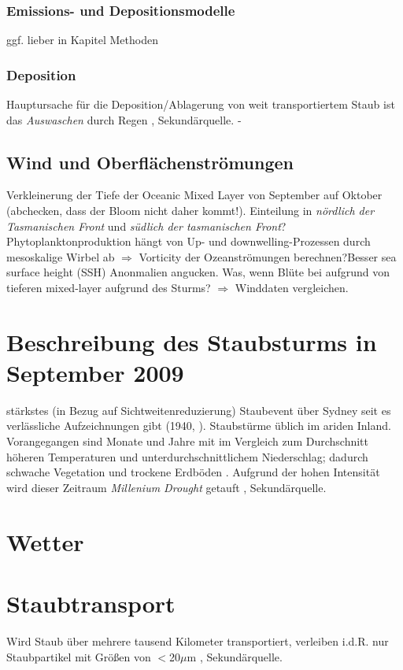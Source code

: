 \documentclass[12pt,a4paper,onecolumn]{scrartcl}
\begin{document}
\subsubsection{Emissions- und Depositionsmodelle}
ggf. lieber in Kapitel Methoden
\subsubsection{Deposition}
Hauptursache für die Deposition/Ablagerung von weit transportiertem Staub ist das \textit{Auswaschen} durch Regen \citep{Marx.2018}, Sekundärquelle. - 

\subsection{Wind und Oberflächenströmungen}
Verkleinerung der Tiefe der Oceanic Mixed Layer von September auf Oktober \citep{Tilburg.2002} (abchecken, dass der Bloom nicht daher kommt!). Einteilung in \textit{nördlich der Tasmanischen Front} und \textit{südlich der tasmanischen Front}? Phytoplanktonproduktion hängt von Up- und downwelling-Prozessen durch mesoskalige Wirbel ab \citep{Tilburg.2002} $\Rightarrow$ Vorticity der Ozeanströmungen berechnen?Besser sea surface height (SSH) Anonmalien angucken. Was, wenn Blüte bei \citet{Gabric.2016} aufgrund von tieferen mixed-layer aufgrund des Sturms? $\Rightarrow$ Winddaten vergleichen. 
\section{Beschreibung des Staubsturms in September 2009}
stärkstes (in Bezug auf Sichtweitenreduzierung) Staubevent über Sydney seit es verlässliche Aufzeichnungen gibt (1940, \citet{Leys.2011}). Staubstürme üblich im ariden Inland. Vorangegangen sind Monate und Jahre mit im Vergleich zum Durchschnitt höheren Temperaturen und unterdurchschnittlichem Niederschlag; dadurch schwache Vegetation und trockene Erdböden \citep{Leys.2011}. Aufgrund der hohen Intensität wird dieser Zeitraum \textit{Millenium Drought} getauft \citep{Deckker.2014}, Sekundärquelle.
\section{Wetter}

\section{Staubtransport}
Wird Staub über mehrere tausend Kilometer transportiert, verleiben i.d.R. nur Staubpartikel mit Größen von $<$20$\mu$m \citep{Marx.2018}, Sekundärquelle.
\end{document}
